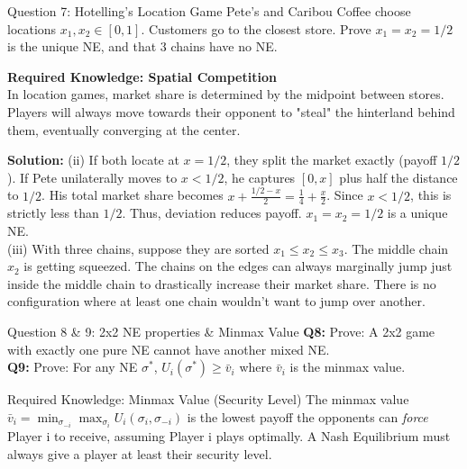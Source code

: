 \documentclass[12pt, a4paper]{article}
\begin{document}
\vspace{0.5cm}
\begin{exbox}{Question 7: Hotelling's Location Game}
Pete's and Caribou Coffee choose locations $x_1, x_2 \in [0,1]$. Customers go to the closest store. Prove $x_1=x_2=1/2$ is the unique NE, and that 3 chains have no NE.
\end{exbox}

\begin{notebox}
\textbf{Required Knowledge: Spatial Competition} \\
In location games, market share is determined by the midpoint between stores. Players will always move towards their opponent to "steal" the hinterland behind them, eventually converging at the center.
\end{notebox}

\textbf{Solution:} 
(ii) If both locate at $x=1/2$, they split the market exactly (payoff $1/2$). If Pete unilaterally moves to $x < 1/2$, he captures $[0, x]$ plus half the distance to $1/2$. His total market share becomes $x + \frac{1/2 - x}{2} = \frac{1}{4} + \frac{x}{2}$. Since $x < 1/2$, this is strictly less than $1/2$. Thus, deviation reduces payoff. $x_1=x_2=1/2$ is a unique NE. \\
(iii) With three chains, suppose they are sorted $x_1 \leq x_2 \leq x_3$. The middle chain $x_2$ is getting squeezed. The chains on the edges can always marginally jump just inside the middle chain to drastically increase their market share. There is no configuration where at least one chain wouldn't want to jump over another.

\vspace{0.5cm}
\begin{exbox}{Question 8 \& 9: 2x2 NE properties \& Minmax Value}
\textbf{Q8:} Prove: A 2x2 game with exactly one pure NE cannot have another mixed NE. \\
\textbf{Q9:} Prove: For any NE $\sigma^*$, $U_i(\sigma^*) \geq \bar{v}_i$ where $\bar{v}_i$ is the minmax value.
\end{exbox}

\begin{defbox}{Required Knowledge: Minmax Value (Security Level)}
The minmax value $\bar{v}_i = \min_{\sigma_{-i}} \max_{\sigma_i} U_i(\sigma_i, \sigma_{-i})$ is the lowest payoff the opponents can \textit{force} Player i to receive, assuming Player i plays optimally. A Nash Equilibrium must always give a player at least their security level.
\end{defbox}
\end{document}
